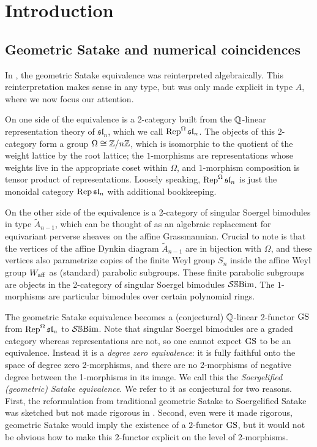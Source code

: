 \section{Introduction}
\subsection{Geometric Satake and numerical coincidences}

 In \cite{EQuantumI}, the geometric Satake equivalence \cite{LusztigGS, Ginz95, MirkVil} was reinterpreted algebraically. This reinterpretation makes sense in any type, but was only made explicit in type $A$, where we now focus our attention.

On one side of the equivalence is a 2-category built from the $\mathbb{Q}$-linear representation theory of $\mathfrak{sl}_n$, which we call $\operatorname{Rep}^{\Omega} \mathfrak{sl}_n$. 
The objects of this $2$-category form a group $\Omega \cong \mathbb{Z}/n\mathbb{Z}$, which is isomorphic to the quotient of the weight lattice by the root lattice; the $1$-morphisms are representations whose weights live in the appropriate coset within $\Omega$, and $1$-morphism composition is tensor product of representations. Loosely speaking, $\operatorname{Rep}^{\Omega} \mathfrak{sl}_n$ is just the monoidal category $\operatorname{Rep} \mathfrak{sl}_n$ with additional bookkeeping.

On the other side of the equivalence is a 2-category of singular Soergel bimodules \cite{WillSingular} in type $\tilde{A}_{n-1}$, which can be thought of as an algebraic replacement for equivariant perverse sheaves on the affine Grassmannian. 
Crucial to note is that the vertices of the affine Dynkin diagram $\tilde{A}_{n-1}$ are in bijection with $\Omega$, and these vertices also parametrize copies of the finite Weyl group $S_n$ inside the affine Weyl group $W_{\operatorname{aff}}$ as (standard) parabolic subgroups. 
These finite parabolic subgroups are objects in the 2-category of singular Soergel bimodules $\mathcal{S}\mathbb{S}\text{Bim}$. The $1$-morphisms are particular bimodules over certain polynomial rings.

The geometric Satake equivalence becomes a (conjectural) $\mathbb{Q}$-linear 2-functor $\operatorname{GS}$ from $\operatorname{Rep}^{\Omega} \mathfrak{sl}_n$ to $\mathcal{S}\mathbb{S}\text{Bim}$. 
Note that singular Soergel bimodules are a graded category whereas representations are not, so one cannot expect $\operatorname{GS}$ to be an equivalence. Instead it is a \emph{degree zero equivalence}: it is fully faithful onto the space of degree zero 2-morphisms, and there are no 2-morphisms of negative degree between the 1-morphisms in its image.
We call this the \emph{Soergelified (geometric) Satake equivalence}. We refer to it as conjectural for two reasons. First, the reformulation from traditional geometric Satake to Soergelified Satake was sketched but not made rigorous in \cite{EQuantumI}. Second, even were it made rigorous, geometric Satake would imply the existence of a $2$-functor $\operatorname{GS}$, but it would not be obvious how to make this $2$-functor explicit on the level of $2$-morphisms.

